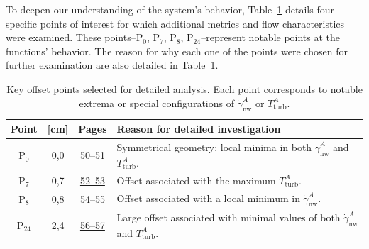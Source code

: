 To deepen our understanding of the system’s behavior, Table~\ref{tab:studied points} details four specific points of interest for which additional metrics and flow characteristics were examined. These points--P$_0$, P$_7$, P$_8$, P$_24$--represent notable points at the functions' behavior. The reason for why each one of the points were chosen for further examination are also detailed in Table~\ref{tab:studied points}.
\vspace{7mm}
\begin{table}[H]
	\bgroup
	\centering
	\setlength\tabcolsep{3mm}
	\def\arraystretch{2.2}%
	\begin{tabular}{|c|c|c|p{8cm}|}
		\hline
		\textbf{Point} & \boldmath{$o_1$} \textbf{[cm]} & \textbf{Pages} & \textbf{Reason for detailed investigation} \\ \hline
		P$_0$ & 0{,}0 & \hyperlink{page.50}{50--51} & Symmetrical geometry; local minima in both $\dot{\gamma}^{A}_{\mathrm{nw}}$ and $T^{A}_{\mathrm{turb}}$. \\ \hline
		P$_7$ & 0{,}7 & \hyperlink{page.52}{52--53} & Offset associated with the maximum $T^{A}_{\mathrm{turb}}$. \\ \hline
		P$_8$ & 0{,}8 & \hyperlink{page.54}{54--55} &  Offset associated with a local minimum in $\dot{\gamma}^{A}_{\mathrm{nw}}$. \\ \hline
		P$_{24}$ & 2{,}4 & \hyperlink{page.56}{56--57} & Large offset associated with minimal values of both $\dot{\gamma}^{A}_{\mathrm{nw}}$ and $T^{A}_{\mathrm{turb}}$. \\ \hline
	\end{tabular}
	 \caption{Key offset points selected for detailed analysis. Each point corresponds to notable extrema or special configurations of $\dot{\gamma}^{A}_{\mathrm{nw}}$ or $T^{A}_{\mathrm{turb}}$.}
	\label{tab:studied points}
	\egroup
\end{table}



